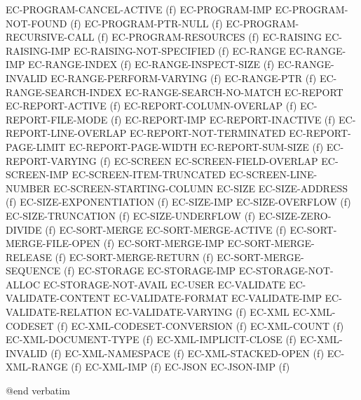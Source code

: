     EC-PROGRAM-CANCEL-ACTIVE (f)
    EC-PROGRAM-IMP
    EC-PROGRAM-NOT-FOUND (f)
    EC-PROGRAM-PTR-NULL (f)
    EC-PROGRAM-RECURSIVE-CALL (f)
    EC-PROGRAM-RESOURCES (f)
  EC-RAISING                
    EC-RAISING-IMP
    EC-RAISING-NOT-SPECIFIED (f)
  EC-RANGE                  
    EC-RANGE-IMP
    EC-RANGE-INDEX (f)
    EC-RANGE-INSPECT-SIZE (f)
    EC-RANGE-INVALID
    EC-RANGE-PERFORM-VARYING (f)
    EC-RANGE-PTR (f)
    EC-RANGE-SEARCH-INDEX
    EC-RANGE-SEARCH-NO-MATCH
  EC-REPORT                 
    EC-REPORT-ACTIVE (f)
    EC-REPORT-COLUMN-OVERLAP (f)
    EC-REPORT-FILE-MODE (f)
    EC-REPORT-IMP
    EC-REPORT-INACTIVE (f)
    EC-REPORT-LINE-OVERLAP
    EC-REPORT-NOT-TERMINATED
    EC-REPORT-PAGE-LIMIT
    EC-REPORT-PAGE-WIDTH
    EC-REPORT-SUM-SIZE (f)
    EC-REPORT-VARYING (f)
  EC-SCREEN                 
    EC-SCREEN-FIELD-OVERLAP
    EC-SCREEN-IMP
    EC-SCREEN-ITEM-TRUNCATED
    EC-SCREEN-LINE-NUMBER
    EC-SCREEN-STARTING-COLUMN
  EC-SIZE                   
    EC-SIZE-ADDRESS (f)
    EC-SIZE-EXPONENTIATION (f)
    EC-SIZE-IMP
    EC-SIZE-OVERFLOW (f)
    EC-SIZE-TRUNCATION (f)
    EC-SIZE-UNDERFLOW (f)
    EC-SIZE-ZERO-DIVIDE (f)
  EC-SORT-MERGE             
    EC-SORT-MERGE-ACTIVE (f)
    EC-SORT-MERGE-FILE-OPEN (f)
    EC-SORT-MERGE-IMP
    EC-SORT-MERGE-RELEASE (f)
    EC-SORT-MERGE-RETURN (f)
    EC-SORT-MERGE-SEQUENCE (f)
  EC-STORAGE                
    EC-STORAGE-IMP
    EC-STORAGE-NOT-ALLOC
    EC-STORAGE-NOT-AVAIL
  EC-USER                   
  EC-VALIDATE               
    EC-VALIDATE-CONTENT
    EC-VALIDATE-FORMAT
    EC-VALIDATE-IMP
    EC-VALIDATE-RELATION
    EC-VALIDATE-VARYING (f)
  EC-XML                    
    EC-XML-CODESET (f)
    EC-XML-CODESET-CONVERSION (f)
    EC-XML-COUNT (f)
    EC-XML-DOCUMENT-TYPE (f)
    EC-XML-IMPLICIT-CLOSE (f)
    EC-XML-INVALID (f)
    EC-XML-NAMESPACE (f)
    EC-XML-STACKED-OPEN (f)
    EC-XML-RANGE (f)
    EC-XML-IMP (f)
  EC-JSON                   
    EC-JSON-IMP (f)

@end verbatim
